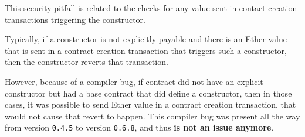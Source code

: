 This security pitfall is related to the checks for any value sent in
contact creation transactions triggering the constructor.

Typically, if a constructor is not explicitly payable and there is an
Ether value that is sent in a contract creation transaction that
triggers such a constructor, then the constructor reverts that
transaction.

However, because of a compiler bug, if contract did not have an explicit
constructor but had a base contract that did define a constructor, then
in those cases, it was possible to send Ether value in a contract
creation transaction, that would not cause that revert to happen. This
compiler bug was present all the way from version \texttt{0.4.5} to
version \texttt{0.6.8}, and thus \textbf{is not an issue anymore}.
